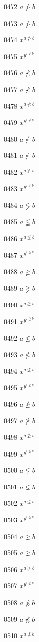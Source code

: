 \documentclass{article}
\begin{document}
0472 $a\ngtr b$\par
0473 $\displaystyle a\ngtr b$\par
0474 $x^{a\ngtr b}$\par
0475 $x^{y^{a\ngtr b}}$\par
0476 $a\nprec b$\par
0477 $\displaystyle a\nprec b$\par
0478 $x^{a\nprec b}$\par
0479 $x^{y^{a\nprec b}}$\par
0480 $a\nsucc b$\par
0481 $\displaystyle a\nsucc b$\par
0482 $x^{a\nsucc b}$\par
0483 $x^{y^{a\nsucc b}}$\par
0484 $a\lneqq b$\par
0485 $\displaystyle a\lneqq b$\par
0486 $x^{a\lneqq b}$\par
0487 $x^{y^{a\lneqq b}}$\par
0488 $a\gneqq b$\par
0489 $\displaystyle a\gneqq b$\par
0490 $x^{a\gneqq b}$\par
0491 $x^{y^{a\gneqq b}}$\par
0492 $a\nleqslant b$\par
0493 $\displaystyle a\nleqslant b$\par
0494 $x^{a\nleqslant b}$\par
0495 $x^{y^{a\nleqslant b}}$\par
0496 $a\ngeqslant b$\par
0497 $\displaystyle a\ngeqslant b$\par
0498 $x^{a\ngeqslant b}$\par
0499 $x^{y^{a\ngeqslant b}}$\par
0500 $a\lneq b$\par
0501 $\displaystyle a\lneq b$\par
0502 $x^{a\lneq b}$\par
0503 $x^{y^{a\lneq b}}$\par
0504 $a\gneq b$\par
0505 $\displaystyle a\gneq b$\par
0506 $x^{a\gneq b}$\par
0507 $x^{y^{a\gneq b}}$\par
0508 $a\npreceq b$\par
0509 $\displaystyle a\npreceq b$\par
0510 $x^{a\npreceq b}$\par
\end{document}
